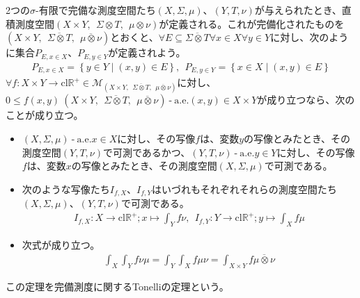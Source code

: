 \documentclass[dvipdfmx]{jsarticle}
\begin{document}
\begin{thm}[完備測度に関するTonelliの定理]\label{4.6.4.8}
2つの$\sigma$-有限で完備な測度空間たち$(X,\varSigma,\mu)$、$(Y,T,\nu)$が与えられたとき、直積測度空間$(X \times Y,\ \ \varSigma \otimes T,\ \ \mu \otimes \nu)$が定義される。これが完備化されたものを$\left( X \times Y,\ \ \overline{\varSigma \otimes T},\ \ \overline{\mu \otimes \nu} \right)$とおくと、$\forall E \subseteq \overline{\varSigma \otimes T}\forall x \in X\forall y \in Y$に対し、次のように集合$P_{E,x \in X}$、$P_{E,y \in Y}$が定義されよう。
\begin{align*}
P_{E,x \in X} = \left\{ y \in Y \middle| (x,y) \in E \right\},\ \ P_{E,y \in Y} = \left\{ x \in X \middle| (x,y) \in E \right\}
\end{align*}
$\forall f:X \times Y \rightarrow \mathrm{cl}\mathbb{R}^{+} \in \mathcal{M}_{\left( X \times Y,\ \ \overline{\varSigma \otimes T},\ \ \overline{\mu \otimes \nu} \right)}$に対し、$0 \leq f(x,y)\ \left( X \times Y,\ \ \overline{\varSigma \otimes T},\ \ \overline{\mu \otimes \nu} \right) \ \text{-} \ \mathrm{a.e.}(x,y) \in X \times Y$が成り立つなら、次のことが成り立つ。
\begin{itemize}
\item
  $(X,\varSigma,\mu) \ \text{-} \ \mathrm{a.e.}x \in X$に対し、その写像$f$は、変数$y$の写像とみたとき、その測度空間$(Y,T,\nu)$で可測であるかつ、$(Y,T,\nu) \ \text{-} \ \mathrm{a.e.}y \in Y$に対し、その写像$f$は、変数$x$の写像とみたとき、その測度空間$(X,\varSigma,\mu)$で可測である。
\item
  次のような写像たち$I_{f,X}$、$I_{f,Y}$はいづれもそれぞれそれらの測度空間たち$(X,\varSigma,\mu)$、$(Y,T,\nu)$で可測である。
\begin{align*}
I_{f,X}:X \rightarrow \mathrm{cl}\mathbb{R}^{+};x \mapsto \int_{Y} {f\nu},\ \ I_{f,Y}:Y \rightarrow \mathrm{cl}\mathbb{R}^{+};y \mapsto \int_{X} {f\mu}
\end{align*}
\item
  次式が成り立つ。
\begin{align*}
\int_{X} {\int_{Y} {f\nu}\mu} = \int_{Y} {\int_{X} {f\mu}\nu} = \int_{X \times Y} {f\overline{\mu \otimes \nu}}
\end{align*}
\end{itemize}
この定理を完備測度に関するTonelliの定理という。
\end{thm}
\end{document}
